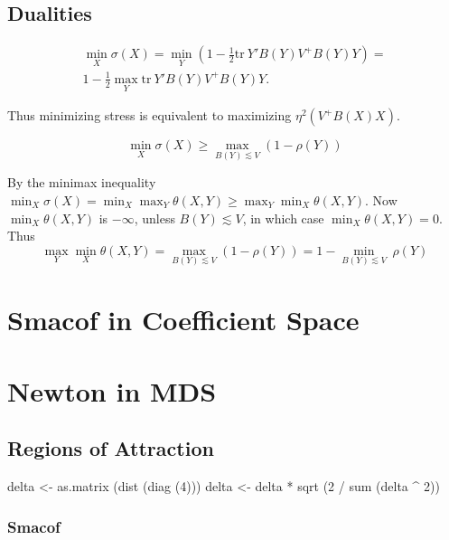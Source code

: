\documentclass[
  12pt,
  letterpaper,
  DIV=11,
  numbers=noendperiod]{scrreprt}
\newenvironment{Shaded}{\begin{snugshade}}{\end{snugshade}}
\newcommand{\DecValTok}[1]{\textcolor[rgb]{0.68,0.00,0.00}{#1}}
\newcommand{\FunctionTok}[1]{\textcolor[rgb]{0.28,0.35,0.67}{#1}}
\newcommand{\NormalTok}[1]{\textcolor[rgb]{0.00,0.23,0.31}{#1}}
\newcommand{\OtherTok}[1]{\textcolor[rgb]{0.00,0.23,0.31}{#1}}
\newcommand{\SpecialCharTok}[1]{\textcolor[rgb]{0.37,0.37,0.37}{#1}}
\theoremstyle{remark}
\begin{document}
\subsection{Dualities}\label{dualities}

\begin{multline}
\min_X\sigma(X)=\min_Y \left(1 - \frac12\text{tr}\ Y'B(Y)V^+B(Y)Y\right)=\\1-\frac12\max_Y\text{tr}\ Y'B(Y)V^+B(Y)Y.
\end{multline}

Thus minimizing stress is equivalent to maximizing \(\eta^2(V^+B(X)X)\).

\[
\min_X\sigma(X)\geq\max_{B(Y)\lesssim V}(1-\rho(Y))
\]

By the minimax inequality
\(\min_X\sigma(X)=\min_X\max_Y\theta(X,Y)\geq\max_Y\min_X\theta(X,Y).\)
Now \(\min_X\theta(X,Y)\) is \(-\infty\), unless \(B(Y)\lesssim V\), in
which case \(\min_X\theta(X,Y)=0\). Thus \[
\max_Y\min_X\theta(X,Y)=\max_{B(Y)\lesssim V}(1-\rho(Y))=1-\min_{B(Y)\lesssim V}\ \rho(Y)
\]

\section{Smacof in Coefficient Space}\label{smacofcoef}

\section{Newton in MDS}\label{smacofnewton}

\subsection{Regions of Attraction}\label{attraction}

\begin{Shaded}
\begin{Highlighting}[]
\NormalTok{delta }\OtherTok{\textless{}{-}} \FunctionTok{as.matrix}\NormalTok{ (}\FunctionTok{dist}\NormalTok{ (}\FunctionTok{diag}\NormalTok{ (}\DecValTok{4}\NormalTok{)))}
\NormalTok{delta }\OtherTok{\textless{}{-}}\NormalTok{ delta }\SpecialCharTok{*} \FunctionTok{sqrt}\NormalTok{ (}\DecValTok{2} \SpecialCharTok{/} \FunctionTok{sum}\NormalTok{ (delta }\SpecialCharTok{\^{}} \DecValTok{2}\NormalTok{))}
\end{Highlighting}
\end{Shaded}

\subsubsection{Smacof}\label{attractsmacof}
\end{document}
